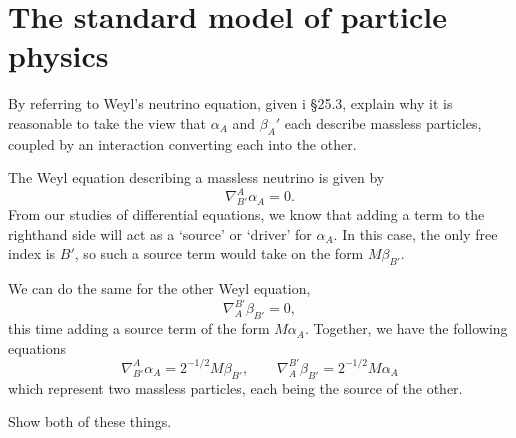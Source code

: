 \documentclass[../road-to-reality.tex]{subfiles}
\begin{document}
	\printanswers
	
	\section{The standard model of particle physics}
	
	\begin{questions}
		\question By referring to Weyl's neutrino equation, given i \S25.3, explain why it is reasonable to take the view that $\alpha_A$ and $\beta_A'$ each describe massless particles, coupled by an interaction converting each into the other.
		
		\begin{solution}
			The Weyl equation describing a massless neutrino is given by
			\[
				\nabla_{B'}^A\alpha_A = 0.
			\]
			From our studies of differential equations, we know that adding a term to the righthand side will act as a `source' or `driver' for $\alpha_A$. In this case, the only free index is $B'$, so such a source term would take on the form $M\beta_{B'}$.
			
			We can do the same for the other Weyl equation,
			\[
				\nabla_A^{B'}\beta_{B'} = 0,
			\]
			this time adding a source term of the form $M\alpha_{A}$. Together, we have the following equations
			\[
				\nabla_{B'}^A\alpha_A = 2^{-1/2}M\beta_{B'},\qquad\nabla_A^{B'}\beta_{B'}=2^{-1/2}M\alpha_{A}
			\]
			which represent two massless particles, each being the source of the other.
		\end{solution}
		
		\question Show both of these things.
		

\end{questions}
\end{document}

